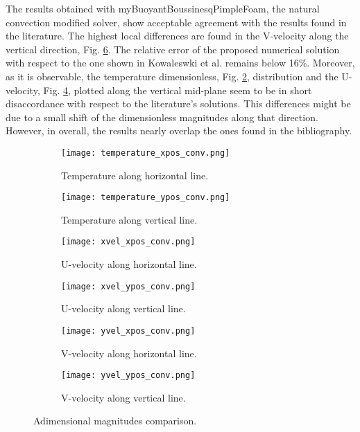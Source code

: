 \noindent The results obtained with myBuoyantBoussinesqPimpleFoam, the natural convection modified solver, show acceptable agreement with the results found in the literature. The highest local differences are found in the V-velocity along the vertical direction, Fig. \ref{3.6ffig}. The relative error of the proposed numerical solution with respect to the one shown in Kowaleswki et al. remains below 16\%. Moreover, as it is observable, the temperature dimensionless, Fig. \ref{3.6bfig}, distribution and the U-velocity, Fig. \ref{3.6dfig}, plotted along the vertical mid-plane seem to be in short disaccordance with respect to the literature's solutions. This differences might be due to a small shift of the dimensionless magnitudes along that direction. However, in overall, the results nearly overlap the ones found in the bibliography.
\clearpage
\begin{figure}[h!]
	\begin{subfigure}{0.50\textwidth}
		\centering
		\texttt{[image: temperature\_xpos\_conv.png]}\hfill
		\caption{Temperature along horizontal line.} \label{3.6afig}
	\end{subfigure}
	\hfill
	\begin{subfigure}{0.50\textwidth}
		\centering
		\texttt{[image: temperature\_ypos\_conv.png]}	
		\caption{Temperature along vertical line.}\label{3.6bfig}
	\end{subfigure}
	\begin{subfigure}{0.50\textwidth}
		\texttt{[image: xvel\_xpos\_conv.png]}\hfill
		\caption{U-velocity along horizontal line.}\label{3.6cfig}
	\end{subfigure}
	\begin{subfigure}{0.50\textwidth}
	\texttt{[image: xvel\_ypos\_conv.png]}	
	\caption{U-velocity along vertical line.}\label{3.6dfig}
	\end{subfigure}
	\begin{subfigure}{0.50\textwidth}
	\texttt{[image: yvel\_xpos\_conv.png]}\hfill	
	\caption{V-velocity along horizontal line.}\label{3.6efig}
	\end{subfigure}
	\begin{subfigure}{0.50\textwidth}
	\texttt{[image: yvel\_ypos\_conv.png]}	
	\caption{V-velocity along vertical line.}\label{3.6ffig}
	\end{subfigure}
	\caption{Adimensional magnitudes comparison.}
	\label{3.6fig}
\end{figure} 

